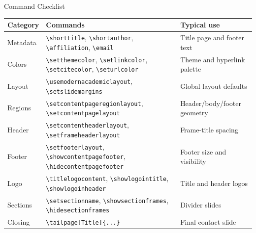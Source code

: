 \documentclass[aspectratio=169,10pt]{beamer}
\begin{document}
\begin{academicframe}{Command Checklist}
  \scriptsize
  \begin{tabular}{lll}
    \toprule
    Category & Commands & Typical use \\
    \midrule
    Metadata &
      \texttt{\textbackslash shorttitle}, \texttt{\textbackslash shortauthor}, \texttt{\textbackslash affiliation}, \texttt{\textbackslash email} &
      Title page and footer text \\
    Colors &
      \texttt{\textbackslash setthemecolor}, \texttt{\textbackslash setlinkcolor}, \texttt{\textbackslash setcitecolor}, \texttt{\textbackslash seturlcolor} &
      Theme and hyperlink palette \\
    Layout &
      \texttt{\textbackslash usemodernacademiclayout}, \texttt{\textbackslash setslidemargins} &
      Global layout defaults \\
    Regions &
      \texttt{\textbackslash setcontentpageregionlayout}, \texttt{\textbackslash setcontentpagelayout} &
      Header/body/footer geometry \\
    Header &
      \texttt{\textbackslash setcontentheaderlayout}, \texttt{\textbackslash setframeheaderlayout} &
      Frame-title spacing \\
    Footer &
      \texttt{\textbackslash setfooterlayout}, \texttt{\textbackslash showcontentpagefooter}, \texttt{\textbackslash hidecontentpagefooter} &
      Footer size and visibility \\
    Logo &
      \texttt{\textbackslash titlelogocontent}, \texttt{\textbackslash showlogointitle}, \texttt{\textbackslash showlogoinheader} &
      Title and header logos \\
    Sections &
      \texttt{\textbackslash setsectionname}, \texttt{\textbackslash showsectionframes}, \texttt{\textbackslash hidesectionframes} &
      Divider slides \\
    Closing &
      \texttt{\textbackslash tailpage[Title]\{...\}} &
      Final contact slide \\
    \bottomrule
  \end{tabular}
\end{academicframe}

\end{document}
